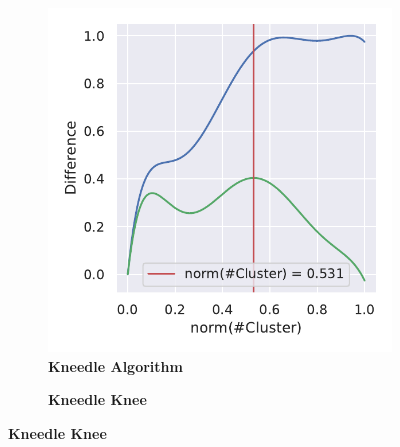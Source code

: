 

\cleardoublepage


\begin{figure}[!hbt]
    \centering
    \begin{subfigure}[b]{0.475\textwidth}
        \caption[Kneedle Algorithm]{\textbf{Kneedle Algorithm}}
        \label{subfig:UMAP_Cluster_Knee_Kneedle_4}            \includegraphics[width=\textwidth]{UMAP/Cluster_Knee_Segment_4.pdf}
    \end{subfigure}
    \hfill
    \begin{subfigure}[b]{0.475\textwidth}
        \caption[Kneedle Knee]{\textbf{Kneedle Knee}}

\end{subfigure}
\end{figure}
